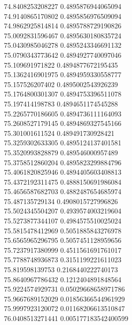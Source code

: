 {74.8408253208227 0.4895876944065094
 \\
74.9140865170802 0.4895856976509094
 \\
74.9862925814814 0.4895788729190826
 \\
75.0092831596467 0.4895630180835724
 \\
75.0430985046278 0.4895243346691132
 \\
75.0790343773642 0.4894927740097046
 \\
75.109691971822 0.4894877672195435
 \\
75.1362416901975 0.4894959330558777
 \\
75.157526207402 0.4895002543926239
 \\
75.1764800301307 0.4894753396511078
 \\
75.197414198783 0.4894651174545288
 \\
75.2265770186605 0.4894736111164093
 \\
75.2608527179145 0.4894869327545166
 \\
75.301001611524 0.489491730928421
 \\
75.3259302633305 0.4895124137401581
 \\
75.3520993828879 0.489546000957489
 \\
75.3758512860204 0.4895823299884796
 \\
75.4061820825946 0.4894405603408813
 \\
75.4372192311475 0.4888150691986084
 \\
75.4656587682703 0.4882487654685974
 \\
75.487135729134 0.4908015727996826
 \\
75.5024345504207 0.4939574003219604
 \\
75.5273877344107 0.4984575510025024
 \\
75.5815478412969 0.5051885843276978
 \\
75.6565965296795 0.5057451128959656
 \\
75.7237917380999 0.4511561691761017
 \\
75.7788748936873 0.3151199221611023
 \\
75.819598139753 0.2168440222740173
 \\
75.8640967786432 0.1212404891848564
 \\
75.9224574929731 0.05029668658971786
 \\
75.9667689152029 0.01856366544961929
 \\
75.9997923120072 0.01168206613510847
 \\
76.0408513271441 0.005177183542400599
 \\
}
